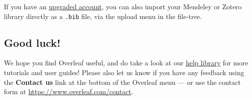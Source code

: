 \documentclass[dvipdfmx,twocolumn]{jsarticle}
\begin{document}
            If you have an \href{https://www.overleaf.com/user/subscription/plans}{upgraded account}, you can also import your Mendeley or Zotero library directly as a \verb|.bib| file, via the upload menu in the file-tree.

      \subsection{Good luck!}

            We hope you find Overleaf useful, and do take a look at our \href{https://www.overleaf.com/learn}{help library} for more tutorials and user guides! Please also let us know if you have any feedback using the \textbf{Contact us} link at the bottom of the Overleaf menu --- or use the contact form at \url{https://www.overleaf.com/contact}.

            
            
\end{document}
